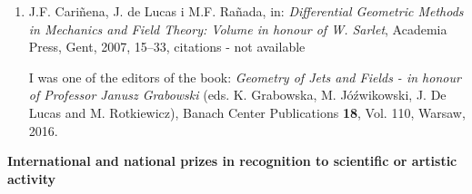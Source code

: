 \documentclass[12pt,reqno]{amsbook}
\begin{document}
\begin{enumerate}
\item J.F. Cari\~nena, J. de Lucas i M.F. Ra\~nada,
\color{blue}{\it Nonlinear superpositions and Ermakov systems }\color{black} in: {\sl Differential Geometric Methods in Mechanics and Field Theory: Volume in honour of W. Sarlet}, Academia Press, Gent, 2007, 15--33, citations - not available


I was one of the editors of the book: 
{\sl Geometry of Jets and Fields - in honour of Professor Janusz Grabowski} (eds.
K. Grabowska, M. J\'o\'zwikowski, J. De Lucas and M. Rotkiewicz), Banach Center Publications {\bf 18}, Vol. 110, Warsaw, 2016.
\end{enumerate}

\vskip 0.3cm
{\bf International and national prizes in recognition to scientific or artistic activity}
\end{document}
